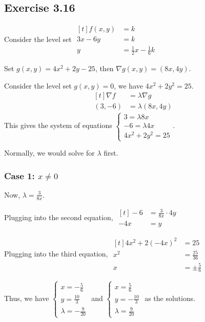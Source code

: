 \documentclass[11pt,fleqn]{book} %
\begin{document}
{~~~}

\subsection*{Exercise 3.16}

Consider the level set 
$\begin{aligned}[t]
    f(x, y) & = k                            \\
    3x - 6y & = k                            \\
    y       & = \frac{1}{2} x - \frac{1}{6}k
\end{aligned}$

Set $g(x, y) = 4x^2 + 2y - 25$, then $\nabla g(x, y) = (8x, 4y)$. 

Consider the level set $g(x, y) = 0$, we have $4x^2 + 2y^2 = 25$.
$$\begin{aligned}[t]
    \nabla f & = \lambda \nabla g \\
    (3, -6)  & = \lambda (8x, 4y)
\end{aligned}$$
This gives the system of equations $\begin{cases} 3 = \lambda 8x \\ -6 = \lambda 4x \\ 4x^2 + 2y^2 = 25 \end{cases}$. 

Normally, we would solve for $\lambda$ first. 

\subsubsection*{Case 1: $x \neq 0$}

Now, $\lambda = \frac{3}{8x}$. 

Plugging into the second equation, $\begin{aligned}[t]
    -6  & = \frac{3}{8x} \cdot 4y \\
    -4x & = y
\end{aligned}$

Plugging into the third equation, $\begin{aligned}[t]
    4x^2 + 2(-4x)^2 & = 25              \\
    x^2             & = \frac{25}{36}   \\
    x               & = \pm \frac{5}{6}
\end{aligned}$

Thus, we have $\begin{cases} x = -\frac{5}{6} \\ y = \frac{10}{3} \\ \lambda = -\frac{9}{20} \end{cases}$ and $\begin{cases} x = \frac{5}{6} \\ y = -\frac{10}{3} \\ \lambda = \frac{9}{20} \end{cases}$ as the solutions. 
\end{document}

